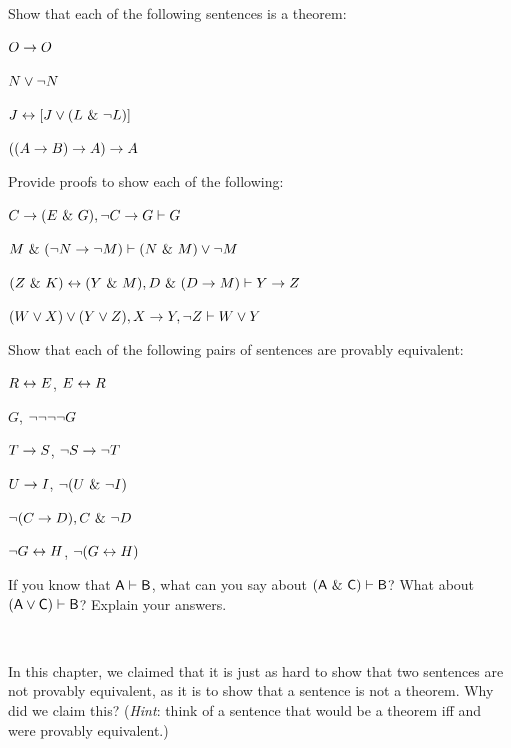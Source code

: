 \practiceproblems
\problempart
Show that each of the following sentences is a theorem:
\begin{earg}
\item $O \rightarrow O$
\item $N \vee {\neg} N$
\item $J \leftrightarrow [J\vee (L~\&~{\neg} L)]$
\item $((A \rightarrow B) \rightarrow A) \rightarrow A$ 
\end{earg}

\problempart
Provide proofs to show each of the following:
\begin{earg}
\item $C\rightarrow(E~\&~ G), {\neg} C \rightarrow G \vdash G$
\item $M ~\&~ ({\neg} N \rightarrow {\neg} M) \vdash (N ~\&~ M) \vee {\neg} M$
\item $(Z~\&~ K)\leftrightarrow(Y~\&~ M), D~\&~(D\rightarrow M) \vdash Y\rightarrow Z$
\item $(W \vee X) \vee (Y \vee Z), X\rightarrow Y, {\neg} Z \vdash W\vee Y$
\end{earg}

\problempart
Show that each of the following pairs of sentences are provably equivalent:
\begin{earg}
\item $R \leftrightarrow E$, $E \leftrightarrow R$
\item $G$, ${\neg}{\neg}{\neg}{\neg} G$
\item $T\rightarrow S$, ${\neg} S \rightarrow {\neg} T$
\item $U \rightarrow I$, ${\neg}(U ~\&~ {\neg} I)$
\item ${\neg} (C \rightarrow D), C ~\&~ {\neg} D$
\item ${\neg} G \leftrightarrow H$, ${\neg}(G \leftrightarrow H)$ 
\end{earg}

\problempart
If you know that $\mathsf{A}\vdash\mathsf{B}$, what can you say about $(\mathsf{A}~\&~\mathsf{C})\vdash\mathsf{B}$? What about $(\mathsf{A}\vee\mathsf{C})\vdash\mathsf{B}$? Explain your answers.

\

\problempart In this chapter, we claimed that it is just as hard to show that two sentences are not provably equivalent, as it is to show that a sentence is not a theorem. Why did we claim this? (\emph{Hint}: think of a sentence that would be a theorem iff  and  were provably equivalent.)



